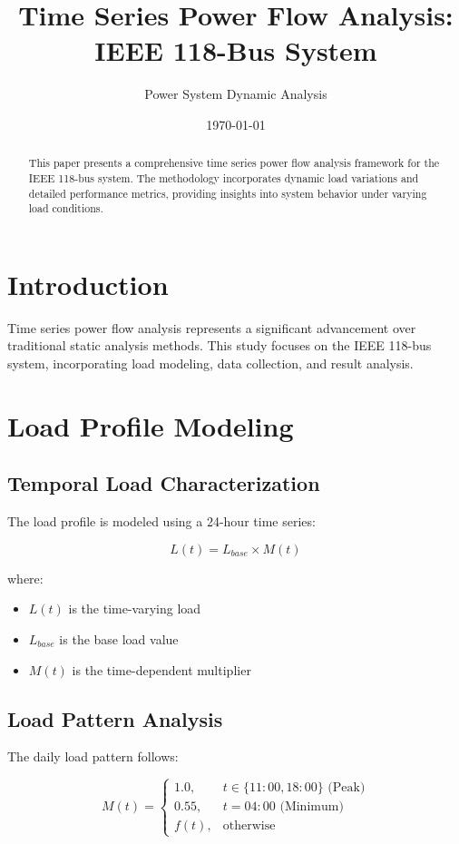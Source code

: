 \documentclass[11pt]{article}
\title{Time Series Power Flow Analysis:\\IEEE 118-Bus System}
\author{Power System Dynamic Analysis}
\date{\today}
\begin{document}
\maketitle

\begin{abstract}
This paper presents a comprehensive time series power flow analysis framework for the IEEE 118-bus system. The methodology incorporates dynamic load variations and detailed performance metrics, providing insights into system behavior under varying load conditions.
\end{abstract}

\section{Introduction}
Time series power flow analysis represents a significant advancement over traditional static analysis methods. This study focuses on the IEEE 118-bus system, incorporating load modeling, data collection, and result analysis.

\section{Load Profile Modeling}

\subsection{Temporal Load Characterization}
The load profile is modeled using a 24-hour time series:

\begin{equation}
L(t) = L_{base} \times M(t)
\end{equation}

where:
\begin{itemize}
    \item $L(t)$ is the time-varying load
    \item $L_{base}$ is the base load value
    \item $M(t)$ is the time-dependent multiplier
\end{itemize}

\subsection{Load Pattern Analysis}
The daily load pattern follows:

\begin{equation}
M(t) = \begin{cases}
1.0, & t \in \{11:00, 18:00\} \text{ (Peak)} \\
0.55, & t = 04:00 \text{ (Minimum)} \\
f(t), & \text{otherwise}
\end{cases}
\end{equation}
\end{document}
